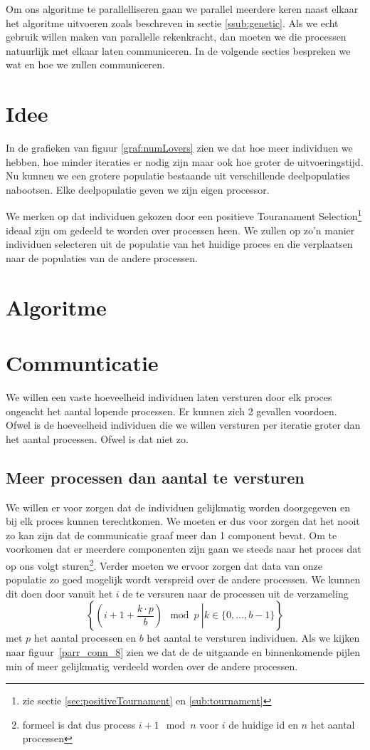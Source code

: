 

Om ons algoritme te parallelliseren gaan we parallel meerdere keren naast elkaar het algoritme uitvoeren zoals beschreven in sectie \ref{ssub:genetic}. Als we echt gebruik willen maken van parallelle rekenkracht, dan moeten we die processen natuurlijk met elkaar laten communiceren.   In de volgende secties bespreken we wat en hoe we zullen communiceren.
\section{Idee}
\label{sec:idee}
In de grafieken van figuur \ref{graf:numLovers} zien we dat hoe meer individuen we hebben, hoe minder iteraties er nodig zijn maar ook hoe groter de uitvoeringstijd. Nu kunnen we een grotere populatie bestaande uit verschillende deelpopulaties nabootsen. Elke deelpopulatie geven we zijn eigen processor.  

We merken op dat individuen gekozen door een positieve Touranament Selection\footnote{zie sectie \ref{sec:positiveTournament} en \ref{sub:tournament}} ideaal zijn om gedeeld te worden over processen heen. We zullen op zo'n manier individuen selecteren uit de populatie van het huidige proces en die verplaatsen naar de populaties van de andere processen. 

\section{Algoritme}


\section{Communticatie}
We willen een vaste hoeveelheid individuen laten versturen door elk proces ongeacht het aantal lopende processen.  
Er kunnen zich 2 gevallen voordoen. Ofwel is de hoeveelheid individuen die we willen versturen per iteratie groter dan het aantal processen. Ofwel is dat niet zo.
\subsection{Meer processen dan aantal te versturen}
We willen er voor zorgen dat de individuen gelijkmatig worden doorgegeven en bij
elk proces kunnen terechtkomen. We moeten er dus voor zorgen dat het nooit zo kan zijn dat de communicatie graaf meer dan 1 component bevat. Om te voorkomen dat er meerdere componenten zijn gaan we steeds naar het proces dat op ons volgt sturen\footnote{formeel is dat dus process $i+1 \mod n$ voor $i$ de huidige id en $n$ het aantal processen}. Verder moeten we ervoor zorgen dat data van onze populatie zo goed mogelijk wordt verspreid over de andere processen. We kunnen dit doen door vanuit het $i$ de te versuren naar de processen uit de verzameling \[
\left\{\left.\left(i + 1 + \frac{k \cdot p}{b}\right) \mod p  ~ \right\rvert   k \in \{0,\dots,b-1\}\right\}
\] met $p$ het aantal processen en $b$ het aantal te versturen individuen. Als we kijken naar figuur~\ref{parr_conn_8} zien we dat de de uitgaande en binnenkomende pijlen min of meer gelijkmatig verdeeld worden over de andere processen. 

